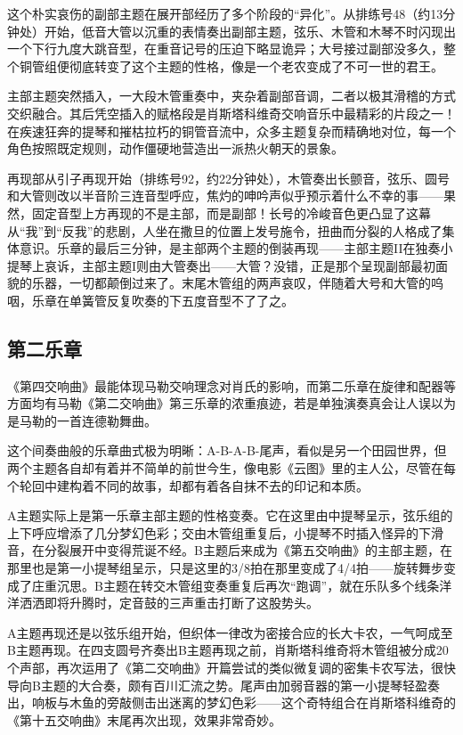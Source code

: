 \documentclass[a4paper,left=2.5cm,right=2.5cm,11pt]{article}
\begin{document}
	这个朴实哀伤的副部主题在展开部经历了多个阶段的“异化”。从排练号48（约13分钟处）开始，低音大管以沉重的表情奏出副部主题，弦乐、木管和木琴不时闪现出一个下行九度大跳音型，在重音记号的压迫下略显诡异；大号接过副部没多久，整个铜管组便彻底转变了这个主题的性格，像是一个老农变成了不可一世的君王。\par

	主部主题突然插入，一大段木管重奏中，夹杂着副部音调，二者以极其滑稽的方式交织融合。其后凭空插入的赋格段是肖斯塔科维奇交响音乐中最精彩的片段之一！在疾速狂奔的提琴和摧枯拉朽的铜管音流中，众多主题复杂而精确地对位，每一个角色按照既定规则，动作僵硬地营造出一派热火朝天的景象。\par

	再现部从引子再现开始（排练号92，约22分钟处），木管奏出长颤音，弦乐、圆号和大管则改以半音阶三连音型呼应，焦灼的呻吟声似乎预示着什么不幸的事——果然，固定音型上方再现的不是主部，而是副部！长号的冷峻音色更凸显了这幕从“我”到“反我”的悲剧，人坐在撒旦的位置上发号施令，扭曲而分裂的人格成了集体意识。乐章的最后三分钟，是主部两个主题的倒装再现——主部主题II在独奏小提琴上哀诉，主部主题I则由大管奏出——大管？没错，正是那个呈现副部最初面貌的乐器，一切都颠倒过来了。末尾木管组的两声哀叹，伴随着大号和大管的呜咽，乐章在单簧管反复吹奏的下五度音型不了了之。

\subsection{第二乐章}
	《第四交响曲》最能体现马勒交响理念对肖氏的影响，而第二乐章在旋律和配器等方面均有马勒《第二交响曲》第三乐章的浓重痕迹，若是单独演奏真会让人误以为是马勒的一首连德勒舞曲。\par

	这个间奏曲般的乐章曲式极为明晰：A-B-A-B-尾声，看似是另一个田园世界，但两个主题各自却有着并不简单的前世今生，像电影《云图》里的主人公，尽管在每个轮回中建构着不同的故事，却都有着各自抹不去的印记和本质。\par

	A主题实际上是第一乐章主部主题的性格变奏。它在这里由中提琴呈示，弦乐组的上下呼应增添了几分梦幻色彩；交由木管组重复后，小提琴不时插入怪异的下滑音，在分裂展开中变得荒诞不经。B主题后来成为《第五交响曲》的主部主题，在那里也是第一小提琴组呈示，只是这里的3/8拍在那里变成了4/4拍——旋转舞步变成了庄重沉思。B主题在转交木管组变奏重复后再次“跑调”，就在乐队多个线条洋洋洒洒即将升腾时，定音鼓的三声重击打断了这股势头。\par

	A主题再现还是以弦乐组开始，但织体一律改为密接合应的长大卡农，一气呵成至B主题再现。在四支圆号齐奏出B主题再现之前，肖斯塔科维奇将木管组被分成20个声部，再次运用了《第二交响曲》开篇尝试的类似微复调的密集卡农写法，很快导向B主题的大合奏，颇有百川汇流之势。尾声由加弱音器的第一小提琴轻盈奏出，响板与木鱼的旁敲侧击出迷离的梦幻色彩——这个奇特组合在肖斯塔科维奇的《第十五交响曲》末尾再次出现，效果非常奇妙。
\end{document}
